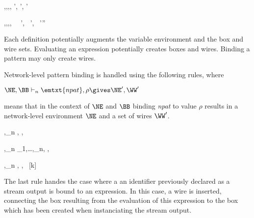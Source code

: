 {\TE,\EE,\NE,\BB,\WW \vdash {} \gives \NE \oplus \NE', \BB \oplus \BB', \WW \oplus
  \WW'}


{\TE,\EE,\NE,\BB,\WW \vdash {}~\tm{=}~ \gives \NE \oplus \NE',~ \BB \oplus
  \BB',~ \WW\oplus\WW'\oplus\WW''}

Each definition potentially augments the variable environment and the box and wire sets.
Evaluating an expression potentially creates boxes and wires. Binding a pattern may only create
wires.

\medskip
Network-level pattern binding is handled using the following rules, where

\begin{center}
$\NE,\BB \vdash_n \emtxt{npat}, \rho \gives \NE', \WW'$
\end{center}

means that in the context of $\NE$ and $\BB$ binding \emph{npat} to value $\rho$ results in a 
network-level environment $\NE$ and a set of wires $\WW'$.


\infrule[TNPatVar]
{}
{\NE,\BB \vdash_n \id, \rho \gives [\id \mapsto \rho],~\emptyenv}

{\NE,\BB \vdash_n \tm{(}_1,\ldots,_n\tm{)}, \tuplen{\rho} \gives
  ,~}

{\NE,\BB \vdash_n \id, \rho \gives \emptyenv,~ [k\mapsto {}]}

The last rule handes the case where a an identifier previously declared as a stream output is bound
to an expression. In this case, a wire is inserted, connecting the box resulting from the evaluation
of this expression to the box which has been created when instanciating the stream output.


